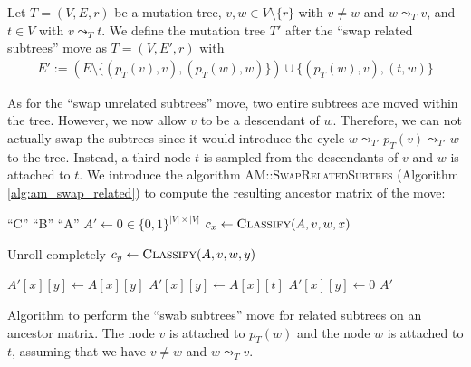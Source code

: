 \begin{definition}
    \label{def:swap_related_subtrees}
    Let $T = (V, E, r)$ be a mutation tree, $v, w \in V \setminus \{r\}$ with $v \neq w$ and $w \leadsto_T v$, and $t \in V$ with $v \leadsto_T t$. We define the mutation tree $T'$ after the ``swap related subtrees'' move as $T = (V, E', r)$ with
    \begin{align*}
        E' := (E \setminus \{(p_T(v), v), (p_T(w), w)\}) \cup \{(p_T(w), v), (t, w)\}
    \end{align*}
\end{definition}

As for the ``swap unrelated subtrees'' move, two entire subtrees are moved within the tree. However, we now allow $v$ to be a descendant of $w$. Therefore, we can not actually swap the subtrees since it would introduce the cycle $w \leadsto_{T'} p_T(v) \leadsto_{T'} w$ to the tree. Instead, a third node $t$ is sampled from the descendants of $v$ and $w$ is attached to $t$. We introduce the algorithm \textsc{AM::SwapRelatedSubtres} (Algorithm \ref{alg:am_swap_related}) to compute the resulting ancestor matrix of the move:

\begin{algorithm}
    \begin{algorithmic}[1]
                \State \Return ``C''
                \State \Return ``B''
            \Else
                \State \Return ``A''
            \EndIf
        \EndFunction
        \State
        \State $A' \leftarrow 0 \in \{0,1\}^{|V| \times |V|}$
            \State $c_x \leftarrow \textsc{Classify}(A, v, w, x)$

             \Comment Unroll completely
                \State $c_y \leftarrow \textsc{Classify}(A, v, w, y)$

                    \State $A'[x][y] \leftarrow A[x][y]$
                    \State $A'[x][y] \leftarrow A[x][t]$
                \Else
                    \State $A'[x][y] \leftarrow 0$
                \EndIf
            \EndFor
        \EndFor
        \State \Return $A'$
        \EndFunction
    \end{algorithmic}
    \caption{Algorithm to perform the ``swab subtrees'' move for related subtrees on an ancestor matrix. The node $v$ is attached to $p_T(w)$ and the node $w$ is attached to $t$, assuming that we have $v \neq w$ and $w \leadsto_T v$.}
    \label{alg:am_swap_related}
\end{algorithm}

